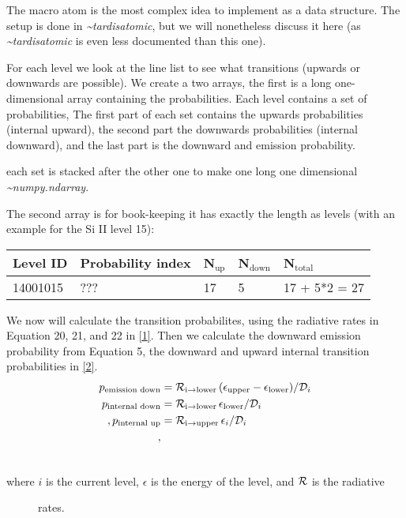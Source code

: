 \documentclass[letterpaper,10pt,english]{sphinxmanual}
\begin{document}
The macro atom is the most complex idea to implement as a data structure. The setup is done in \emph{\textasciitilde{}tardisatomic}, but
we will nonetheless discuss it here (as \emph{\textasciitilde{}tardisatomic} is even less documented than this one).

For each level we look at the line list to see what transitions (upwards or downwards are possible). We create a two arrays,
the first is a long one-dimensional array containing the probabilities. Each level contains a set of probabilities, The first
part of each set contains the upwards probabilities (internal upward), the second part the downwards probabilities
(internal downward), and the last part is the downward and emission probability.

each set is stacked after the other one to make one long one dimensional \emph{\textasciitilde{}numpy.ndarray}.

The second array is for book-keeping it has exactly the length as levels (with an example for the Si II level 15):

\begin{tabulary}{\linewidth}{|L|L|L|L|L|}
\hline
\textbf{
Level ID
} & \textbf{
Probability index
} & \textbf{
N$_{\text{up}}$
} & \textbf{
N$_{\text{down}}$
} & \textbf{
N$_{\text{total}}$
}\\\hline

14001015
 & 
???
 & 
17
 & 
5
 & 
17 + 5*2 = 27
\\\hline
\end{tabulary}


We now will calculate the transition probabilites, using the radiative rates in Equation 20, 21, and 22
in {\hyperref[zreferences:a-a-384-725l]{{[}1{]}}}. Then we calculate the downward emission probability from Equation 5, the downward and
upward internal transition probabilities in {\hyperref[zreferences:a-a-403-261l]{{[}2{]}}}.
\begin{gather}
\begin{split}p_\textrm{emission down}&= {\cal R}_{\textrm{i}\rightarrow\textrm{lower}}\,(\epsilon_\textrm{upper} - \epsilon_\textrm{lower}) / {\cal D}_{i}\\
p_\textrm{internal down}&= {\cal R}_{\textrm{i}\rightarrow\textrm{lower}}\,\epsilon_\textrm{lower}/{\cal D}_{i}\\,
p_\textrm{internal up}&={\cal R}_{\textrm{i}\rightarrow\textrm{upper}}\,\epsilon_{i}/{\cal D}_{i}\\,\end{split}\notag\\\begin{split}\end{split}\notag
\end{gather}\begin{description}
\item[{where $i$ is the current level, $\epsilon$ is the energy of the level, and ${\cal R}$ is the radiative}] \leavevmode
rates.

\end{description}
\end{document}
